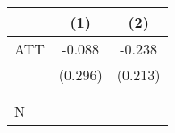 {
\def\sym#1{\ifmmode^{#1}\else\(^{#1}\)\fi}
\begin{tabular}{l*{2}{c}}
\hline\hline
                    &         (1)         &         (2)         \\
\hline
ATT                 &      -0.088         &      -0.238         \\
                    &     (0.296)         &     (0.213)         \\
                    &                     &                     \\
                    &                     &                     \\
\hline
N                   &                     &                     \\
\hline\hline
\end{tabular}
}
